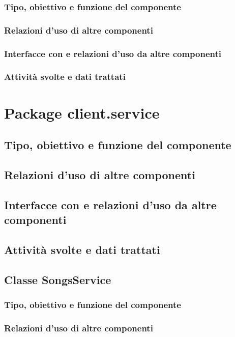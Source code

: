 \subsubsection*{Tipo, obiettivo e funzione del componente}
\subsubsection*{Relazioni d'uso di altre componenti}
\subsubsection*{Interfacce con e relazioni d'uso da altre componenti}
\subsubsection*{Attivit\`a svolte e dati trattati}

\newpage
\section{Package client.service} %
\subsection*{Tipo, obiettivo e funzione del componente}
\subsection*{Relazioni d'uso di altre componenti}
\subsection*{Interfacce con e relazioni d'uso da altre componenti}
\subsection*{Attivit\`a svolte e dati trattati}

\subsection{Classe SongsService}
\subsubsection*{Tipo, obiettivo e funzione del componente}
\subsubsection*{Relazioni d'uso di altre componenti}
